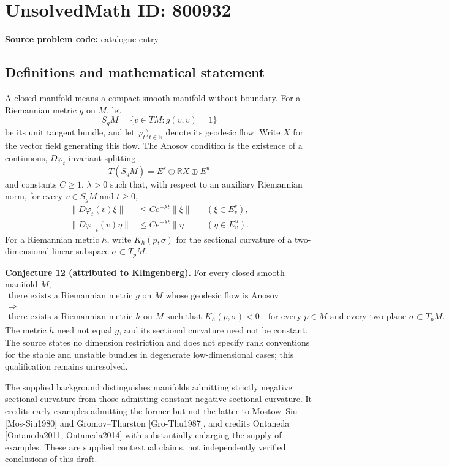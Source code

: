 \documentclass[11pt]{article}
\newcommand{\R}{\mathbb{R}}
\begin{document}
\section*{UnsolvedMath ID: 800932}
\textbf{Source problem code:} catalogue entry
\subsection{Definitions and mathematical statement}
A closed manifold means a compact smooth manifold without boundary. For a Riemannian metric \(g\) on \(M\), let
\[
S_gM=\{v\in TM:g(v,v)=1\}
\]
be its unit tangent bundle, and let \(\varphi_t)_{t\in\R}\) denote its geodesic flow. Write \(X\) for the vector field generating this flow. The Anosov condition is the existence of a continuous, \(D\varphi_t\)-invariant splitting
\[
T(S_gM)=E^s\oplus \R X\oplus E^u
\]
and constants \(C\geq 1\), \(\lambda>0\) such that, with respect to an auxiliary Riemannian norm, for every \(v\in S_gM\) and \(t\geq0\),
\[
\begin{aligned}
\|D\varphi_t(v)\xi\|&\leq C e^{-\lambda t}\|\xi\| &&(\xi\in E^s_v),\\
\|D\varphi_{-t}(v)\eta\|&\leq C e^{-\lambda t}\|\eta\| &&(\eta\in E^u_v).
\end{aligned}
\]
For a Riemannian metric \(h\), write \(K_h(p,\sigma)\) for the sectional curvature of a two-dimensional linear subspace \(\sigma\subset T_pM\).

\textbf{Conjecture 12 (attributed to Klingenberg).} For every closed smooth manifold \(M\),
\[
\begin{gathered}
\text{there exists a Riemannian metric }g\text{ on }M
\text{ whose geodesic flow is Anosov}
\\[2pt]
\Longrightarrow
\\[2pt]
\text{there exists a Riemannian metric }h\text{ on }M
\text{ such that }
K_h(p,\sigma)<0
\quad\text{for every }p\in M\text{ and every two-plane }\sigma\subset T_pM.
\end{gathered}
\]
The metric \(h\) need not equal \(g\), and its sectional curvature need not be constant. The source states no dimension restriction and does not specify rank conventions for the stable and unstable bundles in degenerate low-dimensional cases; this qualification remains unresolved.

The supplied background distinguishes manifolds admitting strictly negative sectional curvature from those admitting constant negative sectional curvature. It credits early examples admitting the former but not the latter to Mostow--Siu [Mos-Siu1980] and Gromov--Thurston [Gro-Thu1987], and credits Ontaneda [Ontaneda2011, Ontaneda2014] with substantially enlarging the supply of examples. These are supplied contextual claims, not independently verified conclusions of this draft.
\end{document}
